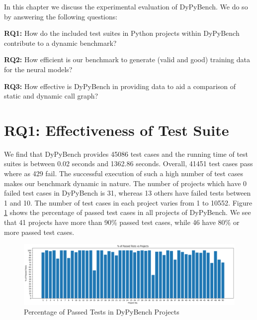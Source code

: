 In this chapter we discuss the experimental evaluation of DyPyBench. We do so by answering the following questions:

\textbf{RQ1:} How do the included test suites in Python projects within DyPyBench contribute to a dynamic benchmark?

\textbf{RQ2:} How efficient is our benchmark to generate (valid and good) training data for the neural models?

\textbf{RQ3:} How effective is DyPyBench in providing data to aid a comparison of static and dynamic call graph?

\section{RQ1: Effectiveness of Test Suite}
We find that DyPyBench provides 45086 test cases and the running time of test suites is between 0.02 seconds and 1362.86 seconds.
Overall, 41451 test cases pass where as 429 fail.
The successful execution of such a high number of test cases makes our benchmark dynamic in nature.
The number of projects which have 0 failed test cases in DyPyBench is 31, whereas 13 others have failed tests between 1 and 10.
The number of test cases in each project varies from 1 to 10552.
Figure \ref{fig:successful_tests} shows the percentage of passed test cases in all projects of DyPyBench.
We see that 41 projects have more than 90\% passed test cases, while 46 have 80\% or more passed test cases.
\begin{figure}[ht]
    \centering
    \includegraphics[width=1\linewidth]{figures/evaluation/perc_passed_tests.png}
    \caption[Passed Test Case Percentage]{\label{fig:successful_tests}Percentage of Passed Tests in DyPyBench Projects}
\end{figure}

